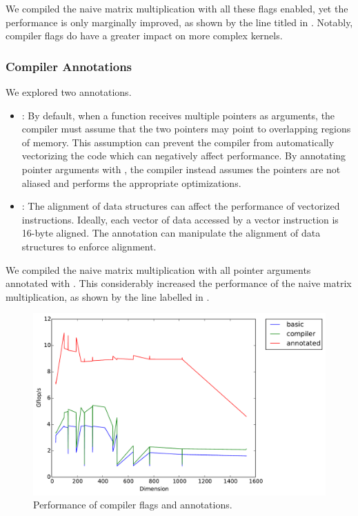 We compiled the naive matrix multiplication with all these \icc{} flags
enabled, yet the performance is only marginally improved, as shown by the line
titled  in . Notably, compiler flags do have a
greater impact on more complex kernels.

\subsubsection{Compiler Annotations}
We explored two \icc{} annotations.
\begin{itemize}
  \item {}:
    By default, when a function receives multiple pointers as arguments, the
    compiler must assume that the two pointers may point to overlapping regions
    of memory. This assumption can prevent the compiler from automatically
    vectorizing the code which can negatively affect performance. By annotating
    pointer arguments with , the compiler instead assumes the
    pointers are not aliased and performs the appropriate optimizations.

  \item {}:
    The alignment of data structures can affect the performance of vectorized
    instructions. Ideally, each vector of data accessed by a vector instruction
    is 16-byte aligned. The  annotation can manipulate the
    alignment of data structures to enforce alignment.
\end{itemize}

We compiled the naive matrix multiplication with all pointer arguments
annotated with . This considerably increased the performance of
the naive matrix multiplication, as shown by the line labelled 
in .

\begin{figure}[h]
  \centering
  \includegraphics[width=\textwidth]{img/timing_compiler.pdf}
  \caption{Performance of compiler flags and annotations.}
  \label{fig:compiler}
\end{figure}
